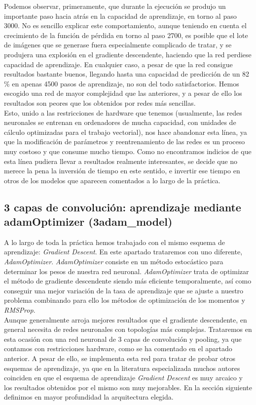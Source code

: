 \documentclass[11pt]{article}
\theoremstyle{plain}
\theoremstyle{definition}
\begin{document}
Podemos observar, primeramente, que durante la ejecución se produjo un
importante paso hacia atrás en la capacidad de aprendizaje, en torno
al paso 3000. No es sencillo explicar este comportamiento, aunque
teniendo en cuenta el crecimiento de la función de pérdida en torno al
paso 2700, es posible que el lote de imágenes que se generase fuera
especialmente complicado de tratar, y se produjera una explosión en el
gradiente descendente, haciendo que la red perdiese capacidad de
aprendizaje. En cualquier caso, a pesar de que la red consigue
resultados bastante buenos, llegando hasta una capacidad de predicción
de un 82 \% en apenas 4500 pasos de aprendizaje, no son del todo
satisfactorios. Hemos escogido una red de mayor complejidad que las
anteriores, y a pesar de ello los resultados son peores que los
obtenidos por redes más sencillas.\\

Esto, unido a las restricciones de hardware que tenemos (usualmente,
las redes neuronales se entrenan en ordenadores de mucha capacidad,
con unidades de cálculo optimizadas para el trabajo vectorial), nos
hace abandonar esta línea, ya que la modificación de parámetros y
reentrenamiento de las redes es un proceso muy costoso y que consume
mucho tiempo. Como no encontramos indicios de que esta línea pudiera
llevar a resultados realmente interesantes, se decide que no merece la
pena la inversión de tiempo en este sentido, e invertir ese tiempo en
otros de los modelos que aparecen comentados a lo largo de la
práctica.

\subsection{3 capas de convolución: aprendizaje mediante adamOptimizer
  (3adam\_model)}

A lo largo de toda la práctica hemos trabajado con el mismo esquema de
aprendizaje: \textit{Gradient Descent}. En este apartado trataremos
con uno diferente, \textit{AdamOptimizer}. \textit{AdamOptimizer}
consiste en un método estocástico para determinar los pesos de nuestra
red neuronal. \textit{AdamOptimizer} trata de optimizar el método de
gradiente descendente siendo más eficiente temporalmente, así como 
conseguir una mejor variación de la tasa de aprendizaje que se ajuste
a nuestro problema combinando para ello los métodos de optimización
de los momentos y \textit{RMSProp}.\\



Aunque generalmente arroja mejores resultados que el gradiente
descendente, en general necesita de redes neuronales con topologías
más complejas.  Trataremos en esta ocasión con una red neuronal de 3
capas de convolución y pooling, ya que contamos con restricciones
hardware, como se ha comentado en el apartado anterior. A pesar de
ello, se implementa esta red para tratar de probar otros esquemas de
aprendizaje, ya que en la literatura especializada muchos autores
coinciden en que el esquema de aprendizaje \textit{Gradient Descent}
es muy arcaico y los resultados obtenidos por el mismo son muy
mejorables. En la sección siguiente definimos en mayor profundidad la
arquitectura elegida.
\end{document}
